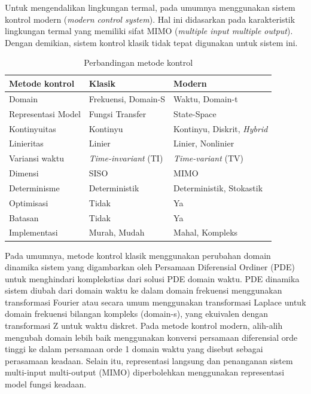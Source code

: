 Untuk mengendalikan lingkungan termal, pada umumnya menggunakan sistem kontrol modern (\textit{modern control system}). Hal ini didasarkan pada karakteristik lingkungan termal yang memiliki sifat MIMO (\textit{multiple input multiple output}). Dengan demikian, sistem kontrol klasik tidak tepat digunakan untuk sistem ini.
\begin{table}[!h]
	\caption{Perbandingan metode kontrol \cite{MPCDissertation}}
	\label{tbl:3:whyann}
	\centering
	\begin{tabular}{|p{4cm}|p{4cm}|p{4.5cm}|}
		\hline
		\textbf{Metode kontrol} & \textbf{Klasik} & \textbf{Modern} \\ 
		\hline
		Domain & Frekuensi, Domain-S & Waktu, Domain-t \\ 
		\hline
		Representasi Model & Fungsi Transfer & State-Space \\ 
		\hline
		Kontinyuitas & Kontinyu & Kontinyu, Diskrit, \textit{Hybrid} \\ 
		\hline
		Linieritas & Linier & Linier, Nonlinier \\ 
		\hline
		Variansi waktu & \textit{Time-invariant} (TI) & \textit{Time-variant} (TV) \\ 
		\hline
		Dimensi & SISO & MIMO \\ 
		\hline
		Determinisme & Deterministik & Deterministik, Stokastik \\ 
		\hline
		Optimisasi & Tidak & Ya \\ 
		\hline
		Batasan & Tidak & Ya \\ 
		\hline
		Implementasi & Murah, Mudah & Mahal, Kompleks \\ 
		\hline
	\end{tabular}
\end{table}

Pada umumnya, metode kontrol klasik menggunakan perubahan domain dinamika sistem yang digambarkan oleh Persamaan Diferensial Ordiner (PDE) untuk menghindari komplekstias dari solusi PDE domain waktu. PDE dinamika sistem diubah dari domain waktu ke dalam domain frekuensi menggunakan transformasi Fourier atau secara umum menggunakan transformasi Laplace untuk domain frekuensi bilangan kompleks (domain-s), yang ekuivalen dengan transformasi Z untuk waktu diskret. Pada metode kontrol modern, alih-alih mengubah domain lebih baik menggunakan konversi persamaan diferensial orde tinggi ke dalam persamaan orde 1 domain waktu yang disebut sebagai perasamaan keadaan. Selain itu, representasi langsung dan penanganan sistem multi-input multi-output (MIMO) diperbolehkan menggunakan representasi model fungsi keadaan.\cite{MPCDissertation}

